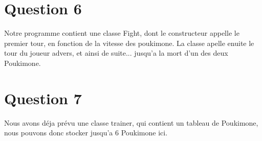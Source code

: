 \documentclass{report}
\begin{document}
\section*{Question 6}
Notre programme contient une classe Fight, dont le constructeur appelle le premier tour, en fonction de la vitesse des poukimone. La classe apelle enuite le tour du joueur advers, et ainsi de suite... jusqu'a la mort d'un des deux Poukimone.

\section*{Question 7}
Nous avons déja prévu une classe trainer, qui contient un tableau de Poukimone, nous pouvons donc stocker jusqu'a 6 Poukimone ici.
\end{document}
